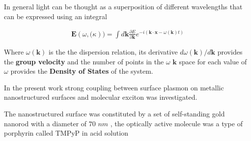 In general light can be thought as a superposition of different wavelengths that can be expressed using an integral

\begin{eqnarray}
	\mathbf{E}(\omega, \mathbf(\kappa) ) = \int d\mathbf{k} \frac{ \partial E }{\partial \mathbf{k} }e^{-i\left( \mathbf{k}\cdot\mathbf{x} - \omega(\mathbf{k})t \right) }
\end{eqnarray}


Where $\omega(\mathbf{k})$ is the the dispersion relation, its derivative $d\omega(\mathbf{k})/d\mathbf{k}$ provides the {\bf group velocity} and the number of points in the $\omega$ $\mathbf{k}$ space for each value of $\omega$ provides the {\bf Density of States} of the system.

In the present work strong coupling between surface plasmon on metallic nanostructured surfaces and molecular exciton was investigated. 

The nanostructured surface was constituted by a set of self-standing gold nanorod with a diameter of $70$ $nm$ , the optically active molecule was a type of porphyrin called TMPyP in acid solution





